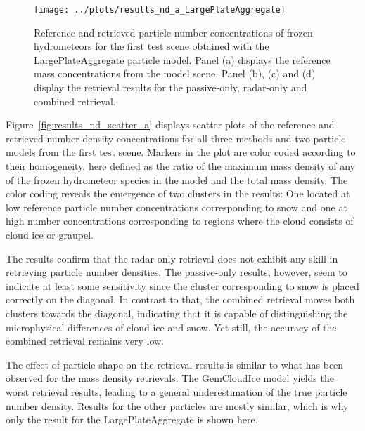 \documentclass[journal abbreviation, manuscript]{copernicus}
\begin{document}
\begin{figure}
\centering
\texttt{[image: ../plots/results\_nd\_a\_LargePlateAggregate]}
\caption{Reference and retrieved particle number concentrations of frozen
  hydrometeors for the first test scene obtained with the LargePlateAggregate
  particle model. Panel (a) displays the reference mass concentrations from the
  model scene. Panel (b), (c) and (d) display the retrieval results for the
  passive-only, radar-only and combined retrieval.}
\label{fig:results_nd_a}
\end{figure}

Figure~\ref{fig:results_nd_scatter_a} displays scatter plots of the reference
and retrieved number density concentrations for all three methods and two
particle models from the first test scene. Markers in the plot are color coded
according to their homogeneity, here defined as the ratio of the maximum mass
density of any of the frozen hydrometeor species in the model and the total mass
density. The color coding reveals the emergence of two clusters in the results:
One located at low reference particle number concentrations corresponding to
snow and one at high number concentrations corresponding to regions where the
cloud consists of cloud ice or graupel.

The results confirm that the radar-only retrieval does not exhibit any skill in
retrieving particle number densities. The passive-only results, however, seem to
indicate at least some sensitivity since the cluster corresponding to snow is
placed correctly on the diagonal. In contrast to that, the combined retrieval
moves both clusters towards the diagonal, indicating that it is capable of
distinguishing the microphysical differences of cloud ice and snow. Yet still,
the accuracy of the combined retrieval remains very low.

The effect of particle shape on the retrieval results is similar to what has
been observed for the mass density retrievals. The GemCloudIce model yields the
worst retrieval results, leading to a general underestimation of the true
particle number density. Results for the other particles are mostly similar,
which is why only the result for the LargePlateAggregate is shown here.
\end{document}
